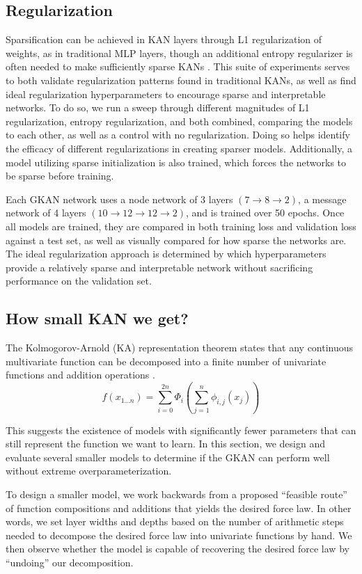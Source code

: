 \documentclass{article}
\begin{document}
\subsection{Regularization}
Sparsification can be achieved in KAN layers through L1 regularization of weights, as in traditional MLP layers, though an additional entropy regularizer is often needed to make sufficiently sparse KANs \parencite{liu2024kankolmogorovarnoldnetworks}. This suite of experiments serves to both validate regularization patterns found in traditional KANs, as well as find ideal regularization hyperparameters to encourage sparse and interpretable networks. To do so, we run a sweep through different magnitudes of L1 regularization, entropy regularization, and both combined, comparing the models to each other, as well as a control with no regularization. Doing so helps identify the efficacy of different regularizations in creating sparser models. Additionally, a model utilizing sparse initialization is also trained, which forces the networks to be sparse before training.

Each GKAN network uses a node network of 3 layers $(7 \to 8 \to 2)$, a message network of 4 layers $(10 \to 12 \to 12 \to 2)$, and is trained over 50 epochs. Once all models are trained, they are compared in both training loss and validation loss against a test set, as well as visually compared for how sparse the networks are. The ideal regularization approach is determined by which hyperparameters provide a relatively sparse and interpretable network without sacrificing performance on the validation set.

\subsection{How small KAN we get?}

The Kolmogorov-Arnold (KA) representation theorem states that any continuous multivariate function can be decomposed into a finite number of univariate functions and addition operations \parencite{liu2024kankolmogorovarnoldnetworks}. 
\[
f(x_{1 \ldots n}) = \sum_{i = 0}^{2n} \Phi_{i} \left( \sum_{j = 1}^{n} \phi_{i, j}(x_{j}) \right)
\]

This suggests the existence of models with significantly fewer parameters that can still represent the function we want to learn. In this section, we design and evaluate several smaller models to determine if the GKAN can perform well without extreme overparameterization.

To design a smaller model, we work backwards from a proposed ``feasible route'' of function compositions and additions that yields the desired force law. In other words, we set layer widths and depths based on the number of arithmetic steps needed to decompose the desired force law into univariate functions by hand. We then observe whether the model is capable of recovering the desired force law by ``undoing'' our decomposition.
\end{document}
